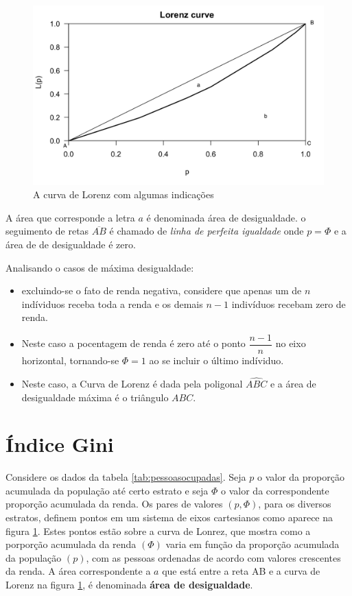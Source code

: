 \documentclass[
]{book}
\providecommand{\tightlist}{%
  \setlength{\itemsep}{0pt}\setlength{\parskip}{0pt}}
\begin{document}
\begin{figure}

{\centering \includegraphics[width=1\linewidth]{lorenz3} 

}

\caption{A curva de Lorenz com algumas indicações}\label{fig:CurvaLorenz}
\end{figure}

A área que corresponde a letra \(a\) é denominada área de desigualdade. o seguimento de retas \(\overline{AB}\) é chamado de \emph{linha de perfeita igualdade} onde \(p=\Phi\) e a área de de desigualdade é zero.

Analisando o casos de máxima desigualdade:

\begin{itemize}
\tightlist
\item
  excluindo-se o fato de renda negativa, considere que apenas um de \(n\) indíviduos receba toda a renda e os demais \(n-1\) indivíduos recebam zero de renda.
\item
  Neste caso a pocentagem de renda é zero até o ponto \(\dfrac{n-1}{n}\) no eixo horizontal, tornando-se \(\Phi = 1\) ao se incluir o último indíviduo.
\item
  Neste caso, a Curva de Lorenz é dada pela poligonal \(\widehat{ABC}\) e a área de desigualdade máxima é o triângulo \(ABC\).
\end{itemize}

\hypertarget{uxedndice-gini}{%
\section{Índice Gini}\label{uxedndice-gini}}

Considere os dados da tabela \ref{tab:pessoasocupadas}. Seja \(p\) o valor da proporção acumulada da população até certo estrato e seja \(\Phi\) o valor da correspondente proporção acumulada da renda. Os pares de valores \((p,\Phi)\), para os diversos estratos, definem pontos em um sistema de eixos cartesianos como aparece na figura \ref{fig:CurvaLorenz}. Estes pontos estão sobre a curva de Lonrez, que mostra como a porporção acumulada da renda \((\Phi)\) varia em função da proporção acumulada da população \((p)\), com as pessoas ordenadas de acordo com valores crescentes da renda. A área correspondente a \(a\) que está entre a reta AB e a curva de Lorenz na figura \ref{fig:CurvaLorenz}, é denominada \textbf{área de desigualdade}.
\end{document}
